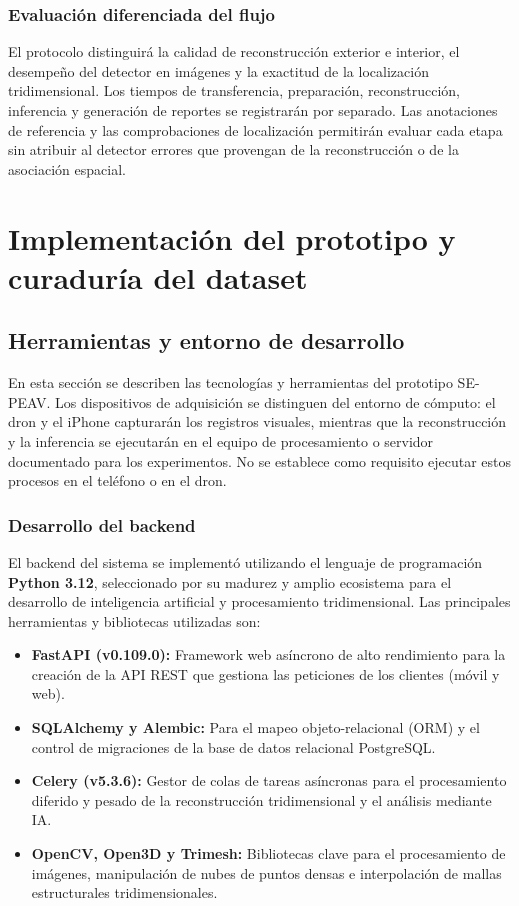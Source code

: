 \documentclass[12pt,oneside]{report}
\begin{document}
\subsection{Evaluación diferenciada del flujo}
El protocolo distinguirá la calidad de reconstrucción exterior e interior, el desempeño del detector en imágenes y la exactitud de la localización tridimensional. Los tiempos de transferencia, preparación, reconstrucción, inferencia y generación de reportes se registrarán por separado. Las anotaciones de referencia y las comprobaciones de localización permitirán evaluar cada etapa sin atribuir al detector errores que provengan de la reconstrucción o de la asociación espacial.

\chapter{Implementación del prototipo y curaduría del dataset}

\section{Herramientas y entorno de desarrollo}
En esta sección se describen las tecnologías y herramientas del prototipo SE-PEAV. Los dispositivos de adquisición se distinguen del entorno de cómputo: el dron y el iPhone capturarán los registros visuales, mientras que la reconstrucción y la inferencia se ejecutarán en el equipo de procesamiento o servidor documentado para los experimentos. No se establece como requisito ejecutar estos procesos en el teléfono o en el dron.

\subsection{Desarrollo del backend}
El backend del sistema se implementó utilizando el lenguaje de programación \textbf{Python 3.12}, seleccionado por su madurez y amplio ecosistema para el desarrollo de inteligencia artificial y procesamiento tridimensional. Las principales herramientas y bibliotecas utilizadas son:
\begin{itemize}
    \item \textbf{FastAPI (v0.109.0):} Framework web asíncrono de alto rendimiento para la creación de la API REST que gestiona las peticiones de los clientes (móvil y web).
    \item \textbf{SQLAlchemy y Alembic:} Para el mapeo objeto-relacional (ORM) y el control de migraciones de la base de datos relacional PostgreSQL.
    \item \textbf{Celery (v5.3.6):} Gestor de colas de tareas asíncronas para el procesamiento diferido y pesado de la reconstrucción tridimensional y el análisis mediante IA.
    \item \textbf{OpenCV, Open3D y Trimesh:} Bibliotecas clave para el procesamiento de imágenes, manipulación de nubes de puntos densas e interpolación de mallas estructurales tridimensionales.
\end{itemize}
\end{document}
